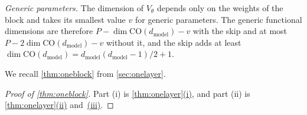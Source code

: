 \documentclass[10pt]{article}
\theoremstyle{definition}
\theoremstyle{remark}
\newcommand{\dm}{d_{\mathrm{model}}}
\newcommand{\CO}{\mathrm{CO}}
\DeclareRobustCommand{\cpref}[2]{\hyperref[#1:#2]{\cref*{#1}(#2)}}
\DeclareRobustCommand{\ptlink}[2]{\hyperref[#1:#2]{(#2)}}
\begin{document}
\emph{Generic parameters.} The dimension of $V_\theta$ depends only on the weights of the block and takes its smallest value $v$ for generic parameters. The generic functional dimensions are therefore $P - \dim\CO(\dm) - v$ with the skip and at most $P - 2\dim\CO(\dm) - v$ without it, and the skip adds at least $\dim\CO(\dm) = \dm(\dm-1)/2 + 1$.


We recall \cref{thm:oneblock} from \cref{sec:onelayer}.
\thmOneBlock*

\begin{proof}[Proof of \cref{thm:oneblock}]
Part (i) is \cpref{thm:onelayer}{i}, and part (ii) is \cpref{thm:onelayer}{ii} and~\ptlink{thm:onelayer}{iii}.
\end{proof}
\end{document}
